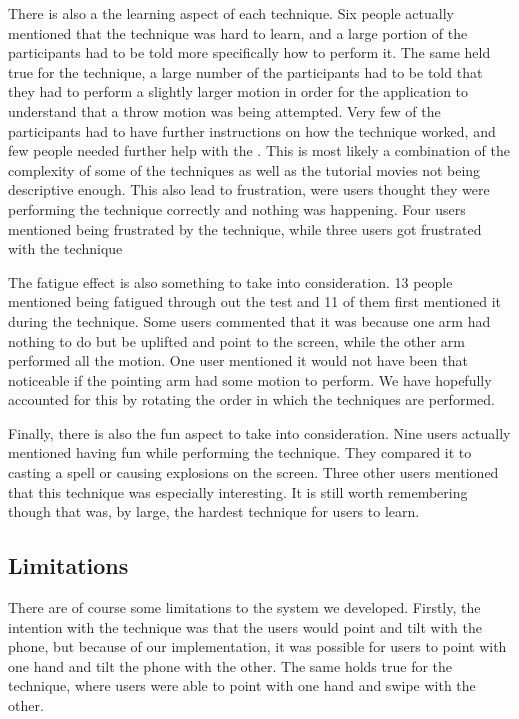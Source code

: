 There is also a the learning aspect of each technique. Six people actually mentioned that the \pinch technique was hard to learn, and a large portion of the participants had to be told more specifically how to perform it. 
The same held true for the \throw technique, a large number of the participants had to be told that they had to perform a slightly larger motion in order for the application to understand that a throw motion was being attempted.
Very few of the participants had to have further instructions on how the \swipe technique worked, and few people needed further help with the \tilt. 
This is most likely a combination of the complexity of some of the techniques as well as the tutorial movies not being descriptive enough. 
This also lead to frustration, were users thought they were performing the technique correctly and nothing was happening. 
Four users mentioned being frustrated by the \pinch technique, while three users got frustrated with the \tilt technique

The fatigue effect is also something to take into consideration. 13 people mentioned being fatigued through out the test and 11 of them first mentioned it during the \throw technique.
Some users commented that it was because one arm had nothing to do but be uplifted and point to the screen, while the other arm performed all the motion.
One user mentioned it would not have been that noticeable if the pointing arm had some motion to perform.
We have hopefully accounted for this by rotating the order in which the techniques are performed. 

Finally, there is also the fun aspect to take into consideration. Nine users actually mentioned having fun while performing the \pinch technique. 
They compared it to casting a spell or causing explosions on the screen. Three other users mentioned that this technique was especially interesting. 
It is still worth remembering though that \pinch was, by large, the hardest technique for users to learn. 

\subsection{Limitations}
\label{sec:limitations}
There are of course some limitations to the system we developed. 
Firstly, the intention with the \tilt technique was that the users would point and tilt with the phone, but because of our implementation, it was possible for users to point with one hand and tilt the phone with the other.
The same holds true for the \swipe technique, where users were able to point with one hand and swipe with the other.

